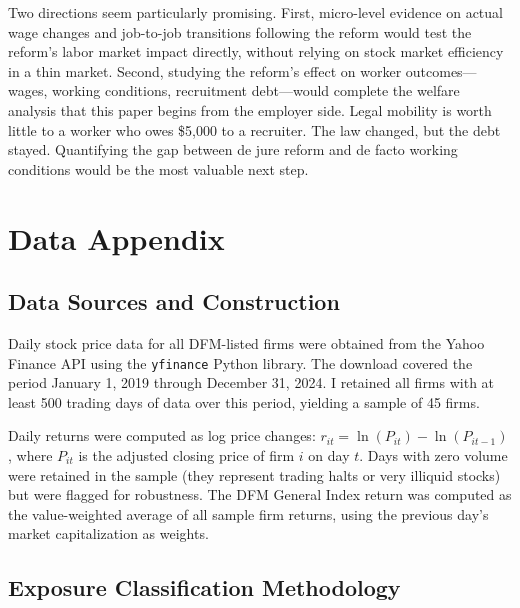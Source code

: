 \documentclass[12pt]{article}
\begin{document}
Two directions seem particularly promising. First, micro-level evidence on actual wage changes and job-to-job transitions following the reform would test the reform's labor market impact directly, without relying on stock market efficiency in a thin market. Second, studying the reform's effect on worker outcomes---wages, working conditions, recruitment debt---would complete the welfare analysis that this paper begins from the employer side. Legal mobility is worth little to a worker who owes \$5,000 to a recruiter. The law changed, but the debt stayed. Quantifying the gap between de jure reform and de facto working conditions would be the most valuable next step.

\label{apep_main_text_end}

\clearpage



\clearpage
\appendix
\setcounter{table}{0}
\renewcommand{\thetable}{A\arabic{table}}
\setcounter{figure}{0}
\renewcommand{\thefigure}{A\arabic{figure}}

\section{Data Appendix}\label{app:data}

\subsection{Data Sources and Construction}

Daily stock price data for all DFM-listed firms were obtained from the Yahoo Finance API using the \texttt{yfinance} Python library. The download covered the period January 1, 2019 through December 31, 2024. I retained all firms with at least 500 trading days of data over this period, yielding a sample of 45 firms.

Daily returns were computed as log price changes: $r_{it} = \ln(P_{it}) - \ln(P_{it-1})$, where $P_{it}$ is the adjusted closing price of firm $i$ on day $t$. Days with zero volume were retained in the sample (they represent trading halts or very illiquid stocks) but were flagged for robustness. The DFM General Index return was computed as the value-weighted average of all sample firm returns, using the previous day's market capitalization as weights.

\subsection{Exposure Classification Methodology}
\end{document}
